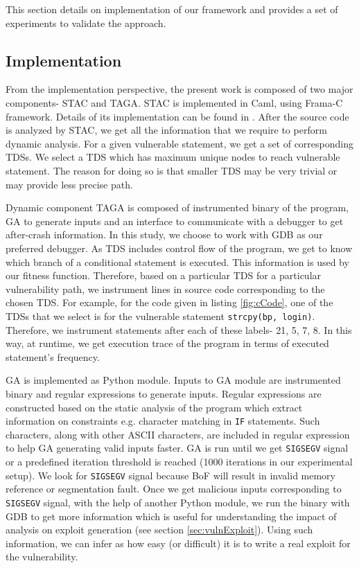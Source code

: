 This section details on implementation of our framework and provides a set of experiments to validate the approach.
\subsection{Implementation}
From the implementation perspective, the present work is composed of two major components- STAC and TAGA. STAC is implemented in Caml, using Frama-C framework. Details of its implementation can be found in \cite{dumitru_tds10}. After the source code is analyzed by STAC, we get all the information that we require to perform dynamic analysis. For a given vulnerable statement, we get a set of corresponding TDSs. We select a TDS which has maximum unique nodes to reach vulnerable statement. The reason for doing so is that smaller TDS may be very trivial or may provide less precise path. \par Dynamic component TAGA is composed of instrumented binary of the program, GA to generate inputs and an interface to communicate with a debugger to get after-crash information. In this study, we choose to work with GDB as our preferred debugger. As TDS includes control flow of the program, we get to know which branch of a conditional statement is executed. This information is used by our fitness function. Therefore, based on a particular TDS for a particular vulnerability path, we instrument lines in source code corresponding to the chosen TDS. For example, for the code given in listing \ref{fig:cCode}, one of the TDSs that we select is  for the vulnerable statement \texttt{strcpy(bp, login)}. Therefore, we instrument statements after each of these labels- 21, 5, 7, 8. In this way, at runtime, we get execution trace of the program in terms of executed statement's frequency.\par GA is implemented as Python module. Inputs to GA module are instrumented binary and regular expressions to generate inputs. Regular expressions are constructed based on the static analysis of the program which extract information on constraints e.g. character matching in \texttt{IF} statements. Such characters, along with other ASCII characters, are included in regular expression to help GA generating valid inputs faster. GA is run until we get \texttt{SIGSEGV} signal or a predefined iteration threshold is reached (1000 iterations in our experimental setup). We look for \texttt{SIGSEGV} signal because BoF will result in invalid memory reference or segmentation fault. Once we get malicious inputs corresponding to \texttt{SIGSEGV} signal, with the help of another Python module, we run the binary with GDB to get more information which is useful for understanding the impact of analysis on exploit generation (see section \ref{sec:vulnExploit}). Using such information, we can infer as how easy (or difficult) it is to write a real exploit for the vulnerability.
